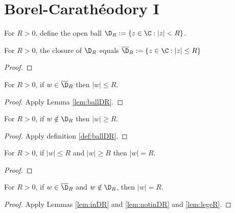 \section{Borel-Carathéodory I}

\begin{definition} \label{def:ballDR}  \leanok
For $R>0$, define the open ball $\D_R := \{ z\in\C : |z| < R\}$.
\end{definition}

\begin{lemma} \label{lem:ballDR}  \leanok
For $R>0$, the closure of $\D_R$ equals $\overline{\D}_R := \{ z\in\C : |z|\le R\}$
\end{lemma}
\begin{proof} \leanok
\end{proof}

\begin{lemma}\label{lem:inDR}  \leanok
For $R>0$, if $w\in \overline{\D}_R$ then $|w|\le R$.
\end{lemma}
\begin{proof} \leanok
{}
Apply Lemma \ref{lem:ballDR}.
\end{proof}

\begin{lemma}\label{lem:notinDR}  \leanok
For $R>0$, if $w\notin \D_R$ then $|w| \ge R$.
\end{lemma}
\begin{proof} \leanok
{}
Apply definition \ref{def:ballDR}.
\end{proof}

\begin{lemma}\label{lem:legeR}  \leanok
For $R>0$, if $|w|\le R$ and $|w|\ge R$ then $|w|=R$.
\end{lemma}
\begin{proof} \leanok
\end{proof}


\begin{lemma} \label{lem:circleDR}  \leanok
For $R>0$, if $w\in \overline{\D}_R$ and $w\notin \D_R$, then $|w|=R$.
\end{lemma}
\begin{proof} \leanok
{}
Apply Lemmas \ref{lem:inDR} and \ref{lem:notinDR} and \ref{lem:legeR}.
\end{proof}

